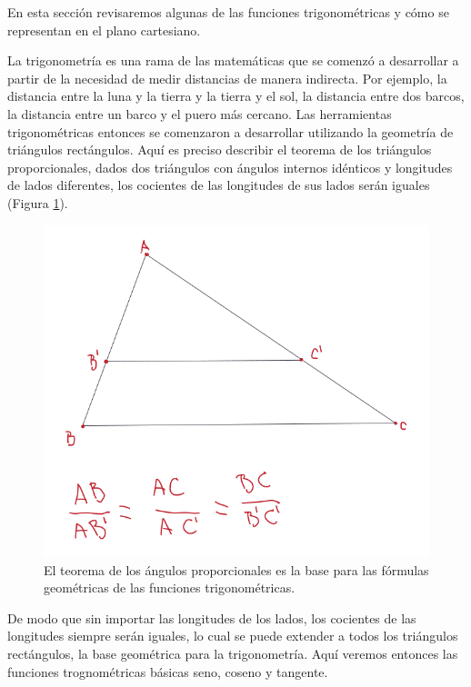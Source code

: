 \documentclass[
]{book}
\begin{document}
En esta sección revisaremos algunas de las funciones trigonométricas y cómo se representan en el plano cartesiano.

La trigonometría es una rama de las matemáticas que se comenzó a desarrollar a partir de la necesidad de medir distancias de manera indirecta. Por ejemplo, la distancia entre la luna y la tierra y la tierra y el sol, la distancia entre dos barcos, la distancia entre un barco y el puero más cercano. Las herramientas trigonométricas entonces se comenzaron a desarrollar utilizando la geometría de triángulos rectángulos. Aquí es preciso describir el teorema de los triángulos proporcionales, dados dos triángulos con ángulos internos idénticos y longitudes de lados diferentes, los cocientes de las longitudes de sus lados serán iguales (Figura \ref{fig:trian-prop}).

\begin{figure}

{\centering \includegraphics[width=8.97in]{Unidad-I/Trian-prop} 

}

\caption{El teorema de los ángulos proporcionales es la base para las fórmulas geométricas de las funciones trigonométricas.}\label{fig:trian-prop}
\end{figure}

De modo que sin importar las longitudes de los lados, los cocientes de las longitudes siempre serán iguales, lo cual se puede extender a todos los triángulos rectángulos, la base geométrica para la trigonometría. Aquí veremos entonces las funciones trognométricas básicas seno, coseno y tangente.
\end{document}
